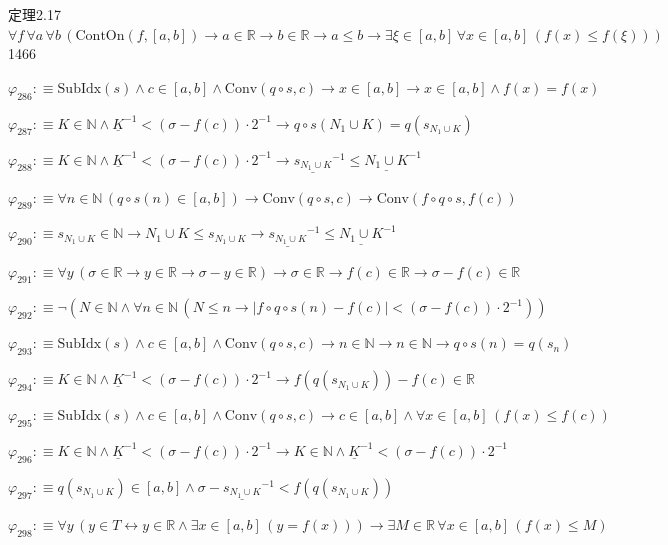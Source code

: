 \begin{fullproof}{定理2.17}{$\forall f\,\forall a\,\forall b\,(\mathrm{ContOn}(f,[a,b]) \to a \in \mathbb{R} \to b \in \mathbb{R} \to a \leq b \to \exists \xi \in [a,b]\,\forall x \in [a,b]\,(f(x) \leq f(\xi)))$}{1466}
\begin{abbrevlist}
\item $\varphi_{286} :\equiv \mathrm{SubIdx}(s) \land c \in [a,b] \land \mathrm{Conv}(q \circ s,c) \to x \in [a,b] \to x \in [a,b] \land f(x) = f(x)$
\item $\varphi_{287} :\equiv K \in \mathbb{N} \land \underline{K}^{-1} < (\sigma - f(c)) \cdot 2^{-1} \to q \circ s(N_{1} \cup K) = q(s_{N_{1} \cup K})$
\item $\varphi_{288} :\equiv K \in \mathbb{N} \land \underline{K}^{-1} < (\sigma - f(c)) \cdot 2^{-1} \to \underline{s_{N_{1} \cup K}}^{-1} \leq \underline{N_{1} \cup K}^{-1}$
\item $\varphi_{289} :\equiv \forall n \in \mathbb{N}\,(q \circ s(n) \in [a,b]) \to \mathrm{Conv}(q \circ s,c) \to \mathrm{Conv}(f \circ q \circ s,f(c))$
\item $\varphi_{290} :\equiv s_{N_{1} \cup K} \in \mathbb{N} \to N_{1} \cup K \leq s_{N_{1} \cup K} \to \underline{s_{N_{1} \cup K}}^{-1} \leq \underline{N_{1} \cup K}^{-1}$
\item $\varphi_{291} :\equiv \forall y\,(\sigma \in \mathbb{R} \to y \in \mathbb{R} \to \sigma - y \in \mathbb{R}) \to \sigma \in \mathbb{R} \to f(c) \in \mathbb{R} \to \sigma - f(c) \in \mathbb{R}$
\item $\varphi_{292} :\equiv \neg (N \in \mathbb{N} \land \forall n \in \mathbb{N}\,(N \leq n \to \lvert f \circ q \circ s(n) - f(c) \rvert < (\sigma - f(c)) \cdot 2^{-1}))$
\item $\varphi_{293} :\equiv \mathrm{SubIdx}(s) \land c \in [a,b] \land \mathrm{Conv}(q \circ s,c) \to n \in \mathbb{N} \to n \in \mathbb{N} \to q \circ s(n) = q(s_{n})$
\item $\varphi_{294} :\equiv K \in \mathbb{N} \land \underline{K}^{-1} < (\sigma - f(c)) \cdot 2^{-1} \to f(q(s_{N_{1} \cup K})) - f(c) \in \mathbb{R}$
\item $\varphi_{295} :\equiv \mathrm{SubIdx}(s) \land c \in [a,b] \land \mathrm{Conv}(q \circ s,c) \to c \in [a,b] \land \forall x \in [a,b]\,(f(x) \leq f(c))$
\item $\varphi_{296} :\equiv K \in \mathbb{N} \land \underline{K}^{-1} < (\sigma - f(c)) \cdot 2^{-1} \to K \in \mathbb{N} \land \underline{K}^{-1} < (\sigma - f(c)) \cdot 2^{-1}$
\item $\varphi_{297} :\equiv q(s_{N_{1} \cup K}) \in [a,b] \land \sigma - \underline{s_{N_{1} \cup K}}^{-1} < f(q(s_{N_{1} \cup K}))$
\item $\varphi_{298} :\equiv \forall y\,(y \in T \leftrightarrow y \in \mathbb{R} \land \exists x \in [a,b]\,(y = f(x))) \to \exists M \in \mathbb{R}\,\forall x \in [a,b]\,(f(x) \leq M)$

\end{abbrevlist}
\end{fullproof}
